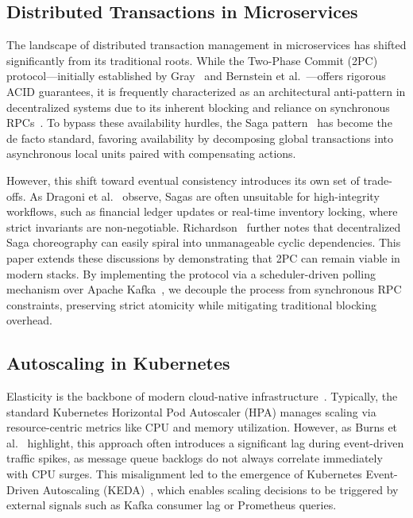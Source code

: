 \documentclass[]{USG}
\begin{document}
\subsection{Distributed Transactions in Microservices}
\label{subsec:rw-transactions}
The landscape of distributed transaction management in microservices has shifted significantly from its traditional roots. While the Two-Phase Commit (2PC) protocol---initially established by Gray~\cite{gray1978notes} and Bernstein et al.~\cite{bernstein1987concurrency}---offers rigorous ACID guarantees, it is frequently characterized as an architectural anti-pattern in decentralized systems due to its inherent blocking and reliance on synchronous RPCs~\cite{helland2007life}. To bypass these availability hurdles, the Saga pattern~\cite{garcia1987sagas} has become the de facto standard, favoring availability by decomposing global transactions into asynchronous local units paired with compensating actions. 

However, this shift toward eventual consistency introduces its own set of trade-offs. As Dragoni et al.~\cite{dragoni2017microservices} observe, Sagas are often unsuitable for high-integrity workflows, such as financial ledger updates or real-time inventory locking, where strict invariants are non-negotiable. Richardson~\cite{richardson2018microservices} further notes that decentralized Saga choreography can easily spiral into unmanageable cyclic dependencies. This paper extends these discussions by demonstrating that 2PC can remain viable in modern stacks. By implementing the protocol via a scheduler-driven polling mechanism over Apache Kafka~\cite{kafka2011}, we decouple the process from synchronous RPC constraints, preserving strict atomicity while mitigating traditional blocking overhead.

\subsection{Autoscaling in Kubernetes}
\label{subsec:rw-autoscaling}
Elasticity is the backbone of modern cloud-native infrastructure~\cite{verma2015large}. Typically, the standard Kubernetes Horizontal Pod Autoscaler (HPA) manages scaling via resource-centric metrics like CPU and memory utilization. However, as Burns et al.~\cite{burns2022kubernetes} highlight, this approach often introduces a significant lag during event-driven traffic spikes, as message queue backlogs do not always correlate immediately with CPU surges. This misalignment led to the emergence of Kubernetes Event-Driven Autoscaling (KEDA)~\cite{kedadocs}, which enables scaling decisions to be triggered by external signals such as Kafka consumer lag or Prometheus queries. 
\end{document}

